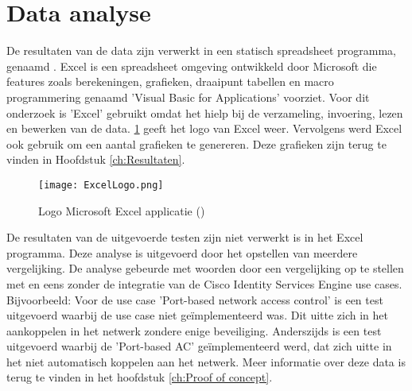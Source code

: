 \section{Data analyse}
\label{sec:Dataanalyse}
De resultaten van de data zijn verwerkt in een statisch spreadsheet programma, genaamd \cite{Excel}. Excel is een spreadsheet omgeving ontwikkeld door Microsoft die features zoals berekeningen, grafieken, draaipunt tabellen en macro programmering genaamd 'Visual Basic for Applications' voorziet. 
Voor dit onderzoek is 'Excel' gebruikt omdat het hielp bij de verzameling, invoering, lezen en bewerken van de data. \ref{fig:SPPS} geeft het logo van Excel weer. Vervolgens werd Excel ook gebruik om een aantal grafieken te genereren. Deze grafieken zijn terug te vinden in Hoofdstuk \ref{ch:Resultaten}.
\begin{figure}[H]
	\centering
	\texttt{[image: ExcelLogo.png]}
	\caption{Logo Microsoft Excel applicatie (\cite{ExcelLogo})}
	\label{fig:SPPS}
\end{figure}
De resultaten van de uitgevoerde testen zijn niet verwerkt is in het Excel programma. Deze analyse is uitgevoerd door het opstellen van meerdere vergelijking. De analyse gebeurde met woorden door een vergelijking op te stellen met en eens zonder de integratie van de Cisco Identity Services Engine use cases. Bijvoorbeeld: Voor de use case 'Port-based network access control' is een test uitgevoerd waarbij de use case niet geïmplementeerd was. Dit uitte zich in het aankoppelen in het netwerk zondere enige beveiliging. Anderszijds is een test uitgevoerd waarbij de 'Port-based AC' geïmplementeerd werd, dat zich uitte in het niet automatisch koppelen aan het netwerk.   
\newline
\newline
Meer informatie over deze data is terug te vinden in het hoofdstuk \ref{ch:Proof of concept}.


